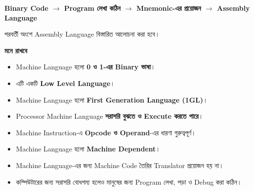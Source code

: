 \begin{center}

\textbf{
Binary Code
\(\longrightarrow\)
Program লেখা কঠিন
\(\longrightarrow\)
Mnemonic-এর প্রয়োজন
\(\longrightarrow\)
Assembly Language
}

\end{center}

পরবর্তী অংশে Assembly Language বিস্তারিত আলোচনা করা হবে।

\begin{rememberbox}

\textbf{\color{deepOrange}মনে রাখবে}

\begin{itemize}

\item Machine Language হলো \textbf{0 ও 1-এর Binary ভাষা}।

\item এটি একটি \textbf{Low Level Language}।

\item Machine Language হলো
\textbf{First Generation Language (1GL)}।

\item Processor Machine Language
\textbf{সরাসরি বুঝতে ও Execute করতে পারে}।

\item Machine Instruction-এ
\textbf{Opcode ও Operand}-এর ধারণা গুরুত্বপূর্ণ।

\item Machine Language হলো
\textbf{Machine Dependent}।

\item Machine Language-এর জন্য Machine Code তৈরির
Translator প্রয়োজন হয় না।

\item কম্পিউটারের জন্য সরাসরি বোধগম্য হলেও মানুষের জন্য
Program লেখা, পড়া ও Debug করা কঠিন।

\end{itemize}

\end{rememberbox}

\small
